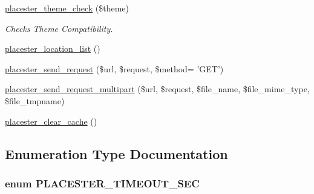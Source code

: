 \begin{DoxyCompactItemize}
\item 
\hyperlink{webservice__client_8php_a34354f5601f44988beeedc78bb6175b9}{placester\_\-theme\_\-check} (\$theme)
\begin{DoxyCompactList}\small\item\em Checks Theme Compatibility. \end{DoxyCompactList}\item 
\hyperlink{webservice__client_8php_adbb62b6e7e035df9aea18d7046ea69ed}{placester\_\-location\_\-list} ()
\item 
\hyperlink{webservice__client_8php_ab19bf98b50be69f711f0187d42492824}{placester\_\-send\_\-request} (\$url, \$request, \$method= 'GET')
\item 
\hyperlink{webservice__client_8php_aa03ca9d26dd9af01c7667b1062924af5}{placester\_\-send\_\-request\_\-multipart} (\$url, \$request, \$file\_\-name, \$file\_\-mime\_\-type, \$file\_\-tmpname)
\item 
\hyperlink{webservice__client_8php_a06766def833bf810c507068cf4e998ae}{placester\_\-clear\_\-cache} ()
\end{DoxyCompactItemize}


\subsection{Enumeration Type Documentation}
\hypertarget{webservice__client_8php_a07df7cefd49d8fe196be7fbb4251c15e}{
\subsubsection[{PLACESTER\_\-TIMEOUT\_\-SEC}]{\setlength{\rightskip}{0pt plus 5cm}enum {\bf PLACESTER\_\-TIMEOUT\_\-SEC}}}
\label{d4/d59/webservice__client_8php_a07df7cefd49d8fe196be7fbb4251c15e}


